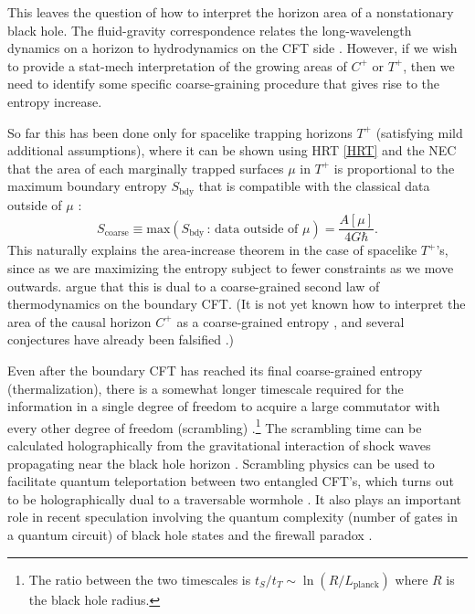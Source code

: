 \documentclass[12pt]{article}
\def\be{\begin{equation}}
\def\ee{\end{equation}}
\begin{document}
This leaves the question of how to interpret the horizon area of a nonstationary black hole.  The fluid-gravity correspondence relates the long-wavelength dynamics on a horizon to hydrodynamics on the CFT side \cite{Hubeny:2011hd}.  However, if we wish to provide a stat-mech interpretation of the growing areas of $C^+$ or $T^+$, then we need to identify some specific coarse-graining procedure that gives rise to the entropy increase.

So far this has been done only for spacelike trapping horizons $T^+$ (satisfying mild additional assumptions), where it can be shown using HRT \eqref{HRT} and the NEC that the area of each marginally trapped surfaces $\mu$ in $T^+$ is proportional to the maximum boundary entropy $S_\text{bdy}$ that is compatible with the classical data outside of $\mu$ \cite{Engelhardt:2017aux,Engelhardt4th}:
\be
S_\text{coarse} \equiv \text{max}(S_\text{bdy} \,:\, \text{data outside of }\mu) = \frac{A[\mu]}{4G\hbar}.
\ee
This naturally explains the area-increase theorem in the case of spacelike $T^+$'s, since as we are maximizing the entropy subject to fewer constraints as we move outwards.  \cite{Engelhardt:2017aux,Engelhardt4th} argue that this is dual to a coarse-grained second law of thermodynamics on the boundary CFT.  (It is not yet known how to interpret the area of the causal horizon $C^+$ as a coarse-grained entropy \cite{Hubeny:2012wa,Kelly:2013aja}, and several conjectures \cite{Freivogel:2013zta,Kelly:2013aja} have already been falsified \cite{Engelhardt:2017wgc}.)

Even after the boundary CFT has reached its final coarse-grained entropy (thermalization), there is a somewhat longer timescale required for the information in a single degree of freedom to acquire a large commutator with every other degree of freedom (scrambling) \cite{Hayden:2007cs,Sekino:2008he}.\footnote{The ratio between the two timescales is $t_S / t_T \sim \ln(R/L_{\text{planck}})$ where $R$ is the black hole radius.}  The scrambling time can be calculated holographically from the gravitational interaction of shock waves propagating near the black hole horizon \cite{Shenker:2013pqa}.  Scrambling physics can be used to facilitate quantum teleportation between two entangled CFT's, which turns out to be holographically dual to a traversable wormhole \cite{Gao:2016bin,Maldacena:2017axo,Susskind:2017nto}.  It also plays an important role in recent speculation involving the quantum complexity (number of gates in a quantum circuit) of black hole states \cite{Stanford:2014jda,Brown:2015bva} and the firewall paradox \cite{Almheiri:2012rt,Almheiri:2013hfa}.  
\end{document}
